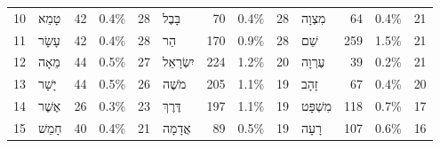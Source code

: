 \begin{table}[htbp!]
\begin{adjustbox}{width=1\textwidth}
\begin{tabular}{llrlrlrlrlrlr}
10   &    \texthebrew{טָמֵא} &     42 &  0.4\% &      28 &        \texthebrew{בָּבֶל} &     70 &  0.4\% &      28 &    \texthebrew{מִצְוָה} &     64 &  0.4\% &      21 \\
11   &   \texthebrew{עָשָׂר} &     42 &  0.4\% &      28 &           \texthebrew{הַר} &    170 &  0.9\% &      28 &       \texthebrew{שֵׁם} &    259 &  1.5\% &      21 \\
12   &    \texthebrew{מֵאָה} &     44 &  0.5\% &      27 &    \texthebrew{יִשְׂרָאֵל} &    224 &  1.2\% &      20 &    \texthebrew{עֶרְוָה} &     39 &  0.2\% &      21 \\
13   &   \texthebrew{יָשָׁר} &     44 &  0.5\% &      26 &        \texthebrew{מֹשֶׁה} &    205 &  1.1\% &      19 &      \texthebrew{זָהָב} &     67 &  0.4\% &      20 \\
14   &   \texthebrew{אֶשֶׁר} &     26 &  0.3\% &      23 &       \texthebrew{דֶּרֶךְ} &    197 &  1.1\% &      19 &  \texthebrew{מִשְׁפָּט} &    118 &  0.7\% &      17 \\
15   &   \texthebrew{חָמֵשׁ} &     40 &  0.4\% &      21 &       \texthebrew{אֲדָמָה} &     89 &  0.5\% &      19 &      \texthebrew{רָעָה} &    107 &  0.6\% &      16 \\
\bottomrule
\end{tabular}
\end{adjustbox}
\end{table}
